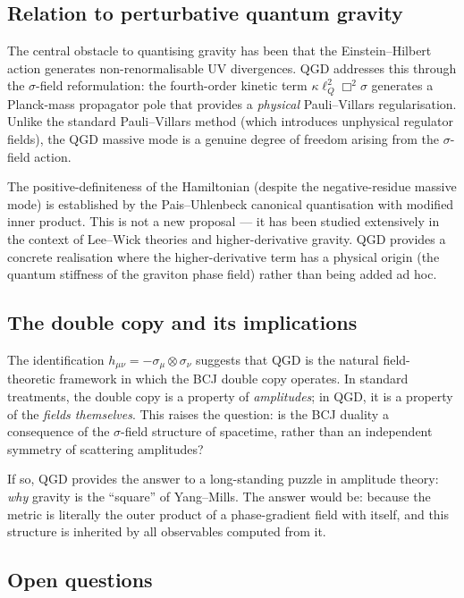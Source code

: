 \documentclass[11pt,a4paper]{article}
\theoremstyle{plain}
\theoremstyle{definition}
\theoremstyle{remark}
\newcommand{\lQ}{\ell_Q}
\begin{document}
\subsection{Relation to perturbative quantum gravity}

The central obstacle to quantising gravity has been that the Einstein--Hilbert action generates non-renormalisable UV divergences.  QGD addresses this through the $\sigma$-field reformulation: the fourth-order kinetic term $\kappa\lQ^2\Box^2\sigma$ generates a Planck-mass propagator pole that provides a \emph{physical} Pauli--Villars regularisation.  Unlike the standard Pauli--Villars method (which introduces unphysical regulator fields), the QGD massive mode is a genuine degree of freedom arising from the $\sigma$-field action.

The positive-definiteness of the Hamiltonian (despite the negative-residue massive mode) is established by the Pais--Uhlenbeck canonical quantisation with modified inner product.  This is not a new proposal --- it has been studied extensively in the context of Lee--Wick theories and higher-derivative gravity.  QGD provides a concrete realisation where the higher-derivative term has a physical origin (the quantum stiffness of the graviton phase field) rather than being added ad hoc.

\subsection{The double copy and its implications}

The identification $h_{\mu\nu} = -\sigma_\mu\otimes\sigma_\nu$ suggests that QGD is the natural field-theoretic framework in which the BCJ double copy operates.  In standard treatments, the double copy is a property of \emph{amplitudes}; in QGD, it is a property of the \emph{fields themselves}.  This raises the question: is the BCJ duality a consequence of the $\sigma$-field structure of spacetime, rather than an independent symmetry of scattering amplitudes?

If so, QGD provides the answer to a long-standing puzzle in amplitude theory: \emph{why} gravity is the ``square'' of Yang--Mills.  The answer would be: because the metric is literally the outer product of a phase-gradient field with itself, and this structure is inherited by all observables computed from it.

\subsection{Open questions}
\end{document}
